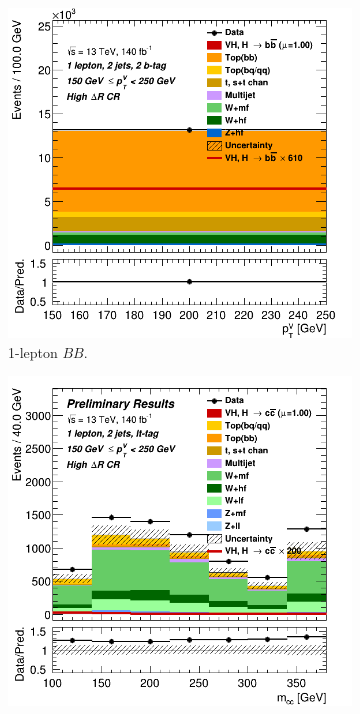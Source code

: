 \begin{figure}[h!]
  \centering
  \begin{subfigure}[b]{0.32\textwidth}
      \centering
      \includegraphics[width=\textwidth]{Images/VH/Own_fit/prefit_VHbb/Region_distpTV_BMax250_BMin150_DCRHigh_J2_TTypebb_T2_L1_Y6051_Prefit.png}
      \caption{1-lepton $BB$.}
      \label{fig:plots_VHcc_ex_OL_CRH}
  \end{subfigure}
  \begin{subfigure}[b]{0.32\textwidth}
      \centering
      \includegraphics[width=\textwidth]{Images/VH/Own_fit/prefit_VHcc/Region_distmBB_BMax250_BMin150_DCRHigh_J2_TTypelt_T2_L1_Y6051_Prefit.png}

\end{subfigure}
\end{figure}
